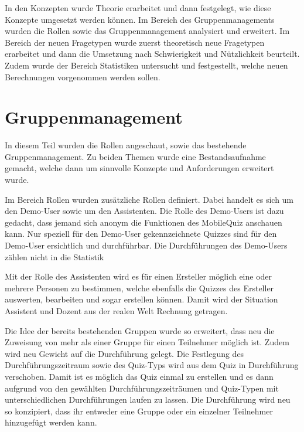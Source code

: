 
In den Konzepten wurde Theorie erarbeitet und dann festgelegt, wie diese Konzepte umgesetzt werden können. Im Bereich des Gruppenmanagements wurden die Rollen sowie das Gruppenmanagement analysiert und erweitert. Im Bereich der neuen Fragetypen wurde zuerst theoretisch neue Fragetypen erarbeitet und dann die Umsetzung nach Schwierigkeit und Nützlichkeit beurteilt. Zudem wurde der Bereich Statistiken untersucht und festgestellt, welche neuen Berechnungen vorgenommen werden sollen.

\section{Gruppenmanagement}
In diesem Teil wurden die Rollen angeschaut, sowie das bestehende Gruppenmanagement. Zu beiden Themen wurde eine Bestandsaufnahme gemacht, welche dann um sinnvolle Konzepte und Anforderungen erweitert wurde.

\bigskip

Im Bereich Rollen wurden zusätzliche Rollen definiert. Dabei handelt es sich um den Demo-User sowie um den Assistenten. Die Rolle des Demo-Users ist dazu gedacht, dass jemand sich anonym die Funktionen des MobileQuiz anschauen kann. Nur speziell für den Demo-User gekennzeichnete Quizzes sind für den Demo-User ersichtlich und durchführbar. Die Durchführungen des Demo-Users zählen nicht in die Statistik

Mit der Rolle des Assistenten wird es für einen Ersteller möglich eine oder mehrere Personen zu bestimmen, welche ebenfalls die Quizzes des Ersteller auswerten, bearbeiten und sogar erstellen können. Damit wird der Situation Assistent und Dozent aus der realen Welt Rechnung getragen. 

\bigskip

Die Idee der bereits bestehenden Gruppen wurde so erweitert, dass neu die Zuweisung von mehr als einer Gruppe für einen Teilnehmer möglich ist. Zudem wird neu Gewicht auf die Durchführung gelegt. Die Festlegung des Durchführungszeitraum sowie des Quiz-Typs wird aus dem Quiz in Durchführung verschoben. Damit ist es möglich das Quiz einmal zu erstellen und es dann aufgrund von den gewählten Durchführungszeiträumen und Quiz-Typen mit unterschiedlichen Durchführungen laufen zu lassen. Die Durchführung wird neu so konzipiert, dass ihr entweder eine Gruppe oder ein einzelner Teilnehmer hinzugefügt werden kann. 

